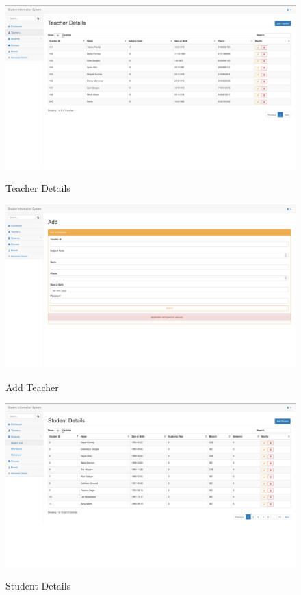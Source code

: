 \begin{figure}[H]
\centering
\caption{Teacher Details}
\includegraphics[width=\textwidth,height=\textheight,keepaspectratio]{./snaps/3.png}
\\[0.2in]
\label{fig:Teacher Details}
\end{figure}

\begin{figure}[H]
\centering
\caption{Add Teacher}
\includegraphics[width=\textwidth,height=\textheight,keepaspectratio]{./snaps/4.png}
\\[0.2in]
\label{fig:Add Teacher}
\end{figure}

\begin{figure}[H]
\centering
\caption{Student Details}
\includegraphics[width=\textwidth,height=\textheight,keepaspectratio]{./snaps/5.png}
\\[0.2in]
\label{fig:Student Details}
\end{figure}

